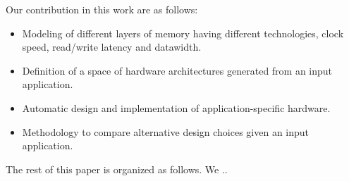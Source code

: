 Our contribution in this work are as follows:
\begin{itemize}
\item Modeling of different layers of memory having different technologies, clock speed, read/write latency and datawidth.
\item Definition of a space of hardware architectures generated from an input application.
\item Automatic design and implementation of application-specific hardware.
\item Methodology to compare alternative design choices given an input application.
\end{itemize}

The rest of this paper is organized as follows. We ..

